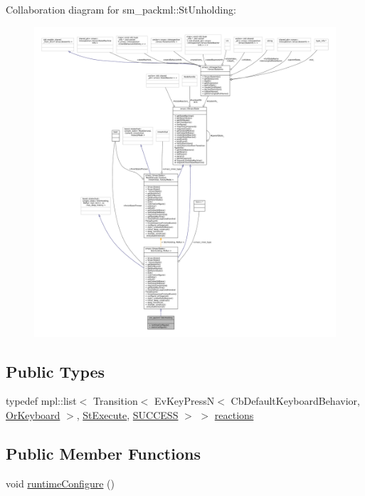 Collaboration diagram for sm\+\_\+packml\+:\+:St\+Unholding\+:
\nopagebreak
\begin{figure}[H]
\begin{center}
\leavevmode
\includegraphics[width=350pt]{structsm__packml_1_1StUnholding__coll__graph}
\end{center}
\end{figure}
\subsection*{Public Types}
\begin{DoxyCompactItemize}
\item 
typedef mpl\+::list$<$ Transition$<$ Ev\+Key\+PressN$<$ Cb\+Default\+Keyboard\+Behavior, \hyperlink{classsm__packml_1_1OrKeyboard}{Or\+Keyboard} $>$, \hyperlink{structsm__packml_1_1StExecute}{St\+Execute}, \hyperlink{classSUCCESS}{S\+U\+C\+C\+E\+SS} $>$ $>$ \hyperlink{structsm__packml_1_1StUnholding_a8fe30f4aae70738cdbac445596f86c8c}{reactions}
\end{DoxyCompactItemize}
\subsection*{Public Member Functions}
\begin{DoxyCompactItemize}
\item 
void \hyperlink{structsm__packml_1_1StUnholding_ab2672ee2064fbdb338741eb2275bb864}{runtime\+Configure} ()
\end{DoxyCompactItemize}
